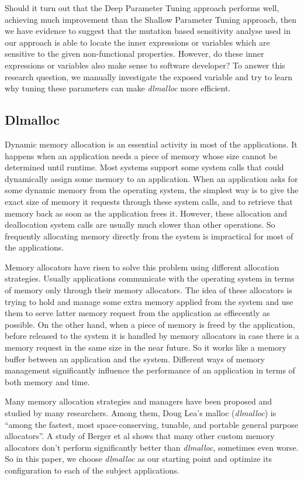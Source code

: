 Should it turn out that the Deep Parameter Tuning approach performs well, achieving much improvement than the Shallow Parameter Tuning approach, then we have evidence to suggest that the mutation based sensitivity analyse used in our approach is able to locate the inner expressions or variables which are sensitive to the given non-functional properties. However, do these inner expressions or variables also make sense to software developer? To answer this research question, we manually investigate the exposed variable and try to learn why tuning these parameters can make \emph{dlmalloc} more efficient.  


\subsection{Dlmalloc}

Dynamic memory allocation is an essential activity in most of the applications. It happens when an application needs a piece of memory whose size cannot be determined until runtime. Most systems support some system calls that could dynamically assign some memory to an application. When an application asks for some dynamic memory from the operating system, the simplest way is to give the exact size of memory it requests through these system calls, and to retrieve that memory back as soon as the application frees it. However, these allocation and deallocation system calls are usually much slower than other operations. So frequently allocating memory directly from the system is impractical for most of the applications. 

Memory allocators have risen to solve this problem using different allocation strategies. Usually applications communicate with the operating system in terms of memory only through their memory allocators. The idea of these allocators is trying to hold and manage some extra memory applied from the system and use them to serve latter memory request from the application as effiecently as possible. On the other hand, when a piece of memory is freed by the application, before released to the system it is handled by memory allocators in case there is a memory request in the same size in the near future. So it works like a memory buffer between an application and the system. Different ways of memory management significantly influence the performance of an application in terms of both memory and time.

Many memory allocation strategies and managers have been proposed and studied by many researchers. Among them, Doug Lea's malloc (\emph{dlmalloc}) \cite{lea1996memory} is ``among the fastest, most space-conserving, tunable, and portable general purpose allocators''. A study of Berger et al\cite{Berger:2002:RCM:583854.582421} shows that many other custom memory allocators don't perform significantly better than \emph{dlmalloc}, sometimes even worse. So in this paper, we choose \emph{dlmalloc} as our starting point and optimize its configuration to each of the subject applications.

